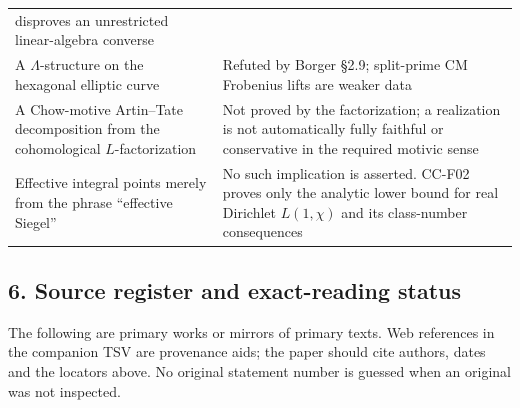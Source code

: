 \documentclass[11pt,a4paper]{article}
\theoremstyle{definition}\newtheorem{definition}[theorem]{Definition}
\theoremstyle{remark}\newtheorem{remark}[theorem]{Remark}
\begin{document}
\begin{longtable}[]{@{}
  >{\raggedright\arraybackslash}p{}
  >{\raggedright\arraybackslash}p{}@{}}
disproves an unrestricted linear-algebra converse \\
A \(\Lambda\)-structure on the hexagonal elliptic curve & Refuted by
Borger §2.9; split-prime CM Frobenius lifts are weaker data \\
A Chow-motive Artin--Tate decomposition from the cohomological
\(L\)-factorization & Not proved by the factorization; a realization is
not automatically fully faithful or conservative in the required motivic
sense \\
Effective integral points merely from the phrase ``effective Siegel'' &
No such implication is asserted. CC-F02 proves only the analytic lower
bound for real Dirichlet \(L(1,\chi)\) and its class-number
consequences \\
\end{longtable}

\subsection{6. Source register and exact-reading
status}\label{source-register-and-exact-reading-status}

The following are primary works or mirrors of primary texts. Web
references in the companion TSV are provenance aids; the paper should
cite authors, dates and the locators above. No original statement number
is guessed when an original was not inspected.
\end{document}
